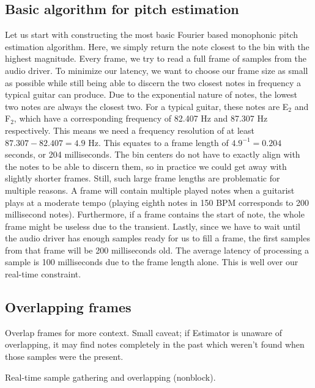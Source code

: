 \documentclass[10pt,twocolumn]{article}
\newcommand{\note}[2]{#1${}_{#2}$}
\begin{document}
\subsection{Basic algorithm for pitch estimation}
Let us start with constructing the most basic Fourier based monophonic pitch estimation algorithm. Here, we simply return the note closest to the bin with the highest magnitude. Every frame, we try to read a full frame of samples from the audio driver. To minimize our latency, we want to choose our frame size as small as possible while still being able to discern the two closest notes in frequency a typical guitar can produce. Due to the exponential nature of notes, the lowest two notes are always the closest two. For a typical guitar, these notes are \note{E}{2} and \note{F}{2}, which have a corresponding frequency of 82.407 Hz and 87.307 Hz respectively. This means we need a frequency resolution of at least $87.307 - 82.407 = 4.9$ Hz. This equates to a frame length of $4.9^{-1} = 0.204$ seconds, or 204 milliseconds. The bin centers do not have to exactly align with the notes to be able to discern them, so in practice we could get away with slightly shorter frames. Still, such large frame lengths are problematic for multiple reasons. A frame will contain multiple played notes when a guitarist plays at a moderate tempo (playing eighth notes in 150 BPM corresponds to 200 millisecond notes). Furthermore, if a frame contains the start of note, the whole frame might be useless due to the transient. Lastly, since we have to wait until the audio driver has enough samples ready for us to fill a frame, the first samples from that frame will be 200 milliseconds old. The average latency of processing a sample is 100 milliseconds due to the frame length alone. This is well over our real-time constraint.

\subsection{Overlapping frames}
Overlap frames for more context. Small caveat; if Estimator is unaware of overlapping, it may find notes completely in the past which weren't found when those samples were the present.

Real-time sample gathering and overlapping (nonblock).

\end{document}
